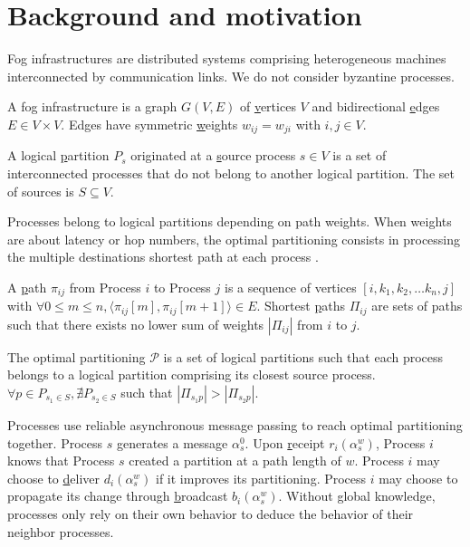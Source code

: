 
\section{Background and motivation}
\label{sec:background}

Fog infrastructures are distributed systems comprising heterogeneous
machines interconnected by communication links. We do not consider
byzantine processes.

\begin{definition}
  A fog infrastructure is a \underline{g}raph $G(V, E)$ of
  \underline{v}ertices $V$ and bidirectional \underline{e}dges $E \in
  V \times V$. Edges have symmetric \underline{w}eights $w_{ij} =
  w_{ji}$ with $i, j \in V$.
\end{definition}

\begin{definition}
  A logical \underline{p}artition $P_s$ originated at a
  \underline{s}ource process $s \in V$ is a set of interconnected
  processes that do not belong to another logical partition. The set
  of sources is $S \subseteq V$.
\end{definition}

Processes belong to logical partitions depending on path weights. When
weights are about latency or hop numbers, the optimal partitioning
consists in processing the multiple destinations shortest path at each
process \REF.

\begin{definition}
  A \underline{p}ath $\pi_{ij}$ from Process $i$ to Process $j$ is a
  sequence of vertices $[i, k_1, k_2, \ldots k_n, j]$ with $\forall
  0\leq m \leq n, \langle \pi_{ij}[m], \pi_{ij}[m+1] \rangle \in
  E$. Shortest \underline{p}aths $\Pi_{ij}$ are sets of paths such
  that there exists no lower sum of weights $|\Pi_{ij}|$ from $i$ to
  $j$.
\end{definition}

\begin{definition}
  The optimal partitioning $\mathcal{P}$ is a set of logical
  partitions such that each process belongs to a logical partition
  comprising its closest source process.  $\forall p \in P_{s_1\in S},
  \nexists P_{s_2 \in S}$ such that $|\Pi_{s_1p}| > |\Pi_{s_2p}|$.
\end{definition}

Processes use reliable asynchronous message passing to reach optimal
partitioning together. Process $s$ generates a message
$\alpha_s^0$. Upon \underline{r}eceipt $r_i(\alpha_s^{w})$, Process
$i$ knows that Process $s$ created a partition at a path length of
$w$. Process $i$ may choose to \underline{d}eliver $d_i(\alpha_s^{w})$
if it improves its partitioning. Process $i$ may choose to propagate
its change through \underline{b}roadcast $b_i(\alpha_s^w)$.  Without
global knowledge, processes only rely on their own behavior to deduce
the behavior of their neighbor processes.

